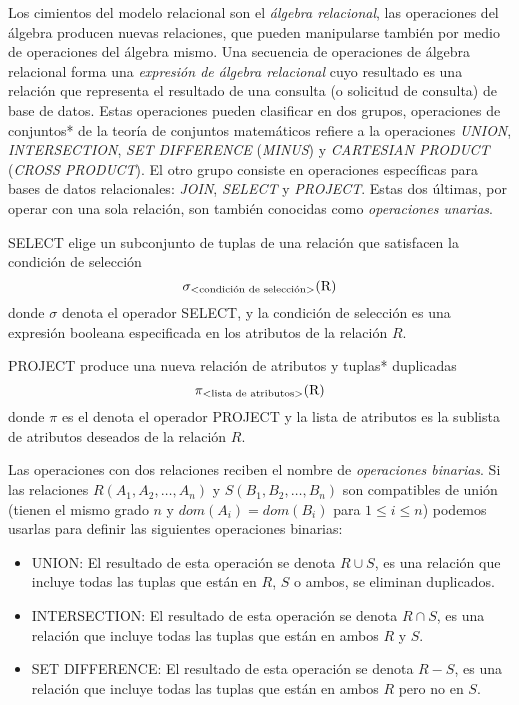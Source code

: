 Los cimientos del modelo relacional son el \emph{álgebra relacional}, las operaciones del álgebra producen nuevas relaciones, que pueden manipularse también por medio de operaciones del álgebra mismo. Una secuencia de operaciones de álgebra relacional forma una \emph{expresión de álgebra relacional} cuyo resultado es una relación que representa el resultado de una consulta (o solicitud de consulta) de base de datos. Estas operaciones pueden clasificar en dos grupos, operaciones de conjuntos* de la teoría de conjuntos matemáticos refiere a la operaciones \emph{UNION}, \emph{INTERSECTION}, \emph{SET DIFFERENCE} (\emph{MINUS}) y \emph{CARTESIAN PRODUCT} (\emph{CROSS PRODUCT}). El otro grupo consiste en operaciones específicas para bases de datos relacionales: \emph{JOIN}, \emph{SELECT} y \emph{PROJECT}. Estas dos últimas, por operar con una sola relación, son también conocidas como \emph{operaciones unarias}.

SELECT elige un subconjunto de tuplas de una relación que satisfacen la condición de selección
\begin{equation}
\sigma_\text{\textless condición de selección\textgreater}{\text{(R)}}
\end{equation}
donde $\sigma$ denota el operador SELECT, y la condición de selección es una expresión booleana especificada en los atributos de la relación $R$.

PROJECT produce una nueva relación de atributos y tuplas*  duplicadas
\begin{equation}
\pi_\text{\textless lista de atributos\textgreater}{\text{(R)}}
\end{equation}
donde $\pi$ es el denota el operador PROJECT y la lista de atributos es la sublista de atributos deseados de la relación $R$.

Las operaciones con dos relaciones reciben el nombre de \emph{operaciones binarias}. Si las relaciones $R(A_1,A_2,\ldots,A_n)$ y $S(B_1,B_2,\ldots,B_n)$ son compatibles de unión (tienen el mismo grado $n$ y $dom(A_i)=dom(B_i)$ para $1\leq i\leq n$) podemos usarlas para definir las siguientes operaciones binarias:
\begin{itemize}
\item UNION: El resultado de esta operación se denota $R \cup S$, es una relación que incluye todas las tuplas que están en $R$, $S$ o ambos, se eliminan duplicados.
\item INTERSECTION: El resultado de esta operación se denota $R \cap S$, es una relación que incluye todas las tuplas que están en ambos $R$ y $S$.
\item SET DIFFERENCE: El resultado de esta operación se denota $R - S$, es una relación que incluye todas las tuplas que están en ambos $R$ pero no en $S$.
\end{itemize}

